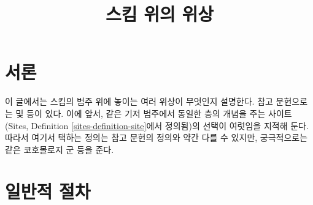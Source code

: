 

%


\title{스킴 위의 위상}

\maketitle

\label{section-phantom}

\tableofcontents



\section{서론}
\label{section-introduction}

\noindent
이 글에서는 스킴의 범주 위에 놓이는 여러 위상이 무엇인지 설명한다.
참고 문헌으로는 \cite{SGA1} 및 \cite{Ner} 등이 있다. 이에 앞서,
같은 기저 범주에서 동일한 층의 개념을 주는 사이트(Sites,
Definition \ref{sites-definition-site}에서 정의됨)의 선택이 여럿임을
지적해 둔다. 따라서 여기서 택하는 정의는 참고 문헌의 정의와 약간
다를 수 있지만, 궁극적으로는 같은 코호몰로지 군 등을 준다.

\section{일반적 절차}
\label{section-procedure}

